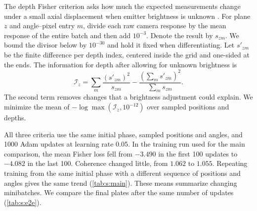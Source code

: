 The depth Fisher criterion asks how much the expected measurements change under a small axial displacement when emitter brightness is unknown \cite{shechtman2014}. For plane $z$ and angle--pixel entry $m$, divide each raw camera response by the mean response of the entire batch and then add $10^{-3}$. Denote the result by $s_{zm}$. We bound the divisor below by $10^{-30}$ and hold it fixed when differentiating. Let $s'_{zm}$ be the finite difference per depth index, centered inside the grid and one-sided at the ends. The information for depth after allowing for unknown brightness is
\begin{equation}
\mathcal I_z=\sum_m\frac{(s'_{zm})^2}{s_{zm}}-
\frac{(\sum_m s'_{zm})^2}{\sum_m s_{zm}} .
\end{equation}
The second term removes changes that a brightness adjustment could explain. We minimize the mean of $-\log\max(\mathcal I_z,10^{-12})$ over sampled positions and depths.

All three criteria use the same initial phase, sampled positions and angles, and 1000 Adam updates at learning rate 0.05. In the training run used for the main comparison, the mean Fisher loss fell from $-3.490$ in the first 100 updates to $-4.082$ in the last 100. Coherence changed little, from $1.062$ to $1.055$. Repeating training from the same initial phase with a different sequence of positions and angles gives the same trend (\cref{tab:s:main}). These means summarize changing minibatches. We compare the final plates after the same number of updates (\cref{tab:s:e2e}).
